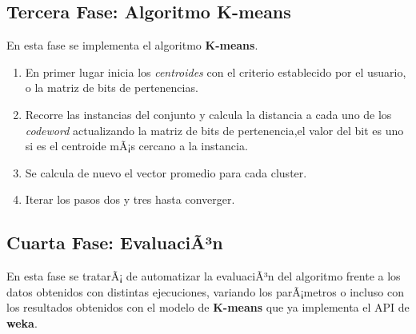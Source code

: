 \documentclass[10pt,a4paper]{article}
\begin{document}
\subsection*{Tercera Fase: Algoritmo K-means}

En esta fase se implementa el algoritmo \textbf{K-means}.
\begin{enumerate}
	\item En primer lugar inicia los \textit{centroides} con el criterio establecido por el usuario, o la matriz de bits de pertenencias.
	\item Recorre las instancias del conjunto y calcula la distancia a cada uno de los \textit{codeword} actualizando la matriz de bits de pertenencia,el valor 		del bit es uno si es el centroide mÃ¡s cercano a la instancia.
	\item Se calcula de nuevo el vector promedio para cada cluster.
	\item Iterar los pasos dos y tres hasta converger.
\end{enumerate}

\subsection*{Cuarta Fase: EvaluaciÃ³n}

En esta fase se tratarÃ¡ de automatizar la evaluaciÃ³n del algoritmo frente a los datos obtenidos con distintas ejecuciones, variando los parÃ¡metros o incluso con  
los resultados obtenidos con el modelo de \textbf{K-means} que ya implementa el API de \textbf{weka}.
\end{document}

